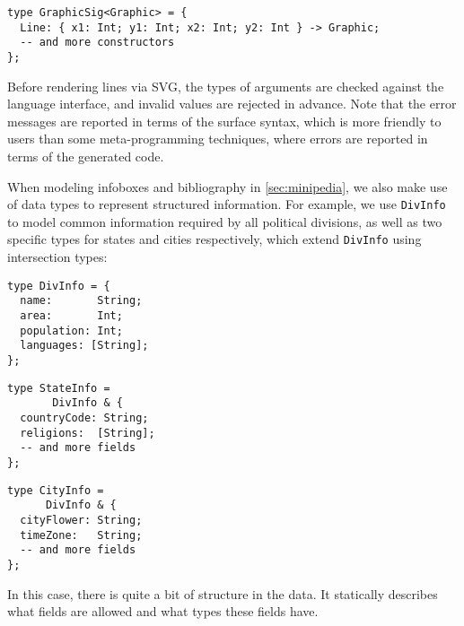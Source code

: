 \begin{lstlisting}
type GraphicSig<Graphic> = {
  Line: { x1: Int; y1: Int; x2: Int; y2: Int } -> Graphic;
  -- and more constructors
};
\end{lstlisting}

\noindent
Before rendering lines via SVG, the types of arguments are checked against the
language interface, and invalid values are rejected in advance. Note that the
error messages are reported in terms of the \ExT surface syntax, which is more
friendly to users than some meta-programming techniques, where errors are
reported in terms of the generated code.

When modeling infoboxes and bibliography in \autoref{sec:minipedia}, we also
make use of data types to represent structured information. For example, we use
\lstinline{DivInfo} to model common information required by all political
divisions, as well as two specific types for states and cities respectively,
which extend \lstinline{DivInfo} using intersection types:

\noindent
\begin{minipage}{0.28\textwidth}
\begin{lstlisting}
type DivInfo = {
  name:       String;
  area:       Int;
  population: Int;
  languages: [String];
};
\end{lstlisting}
\end{minipage}
\hfill
\begin{minipage}{0.29\textwidth}
\begin{lstlisting}
type StateInfo =
       DivInfo & {
  countryCode: String;
  religions:  [String];
  -- and more fields
};
\end{lstlisting}
\end{minipage}
\hfill
\begin{minipage}{0.27\textwidth}
\begin{lstlisting}
type CityInfo =
      DivInfo & {
  cityFlower: String;
  timeZone:   String;
  -- and more fields
};
\end{lstlisting}
\end{minipage}

\noindent In this case, there is quite a bit of structure in the data. It
statically describes what fields are allowed and what types these fields have. 
